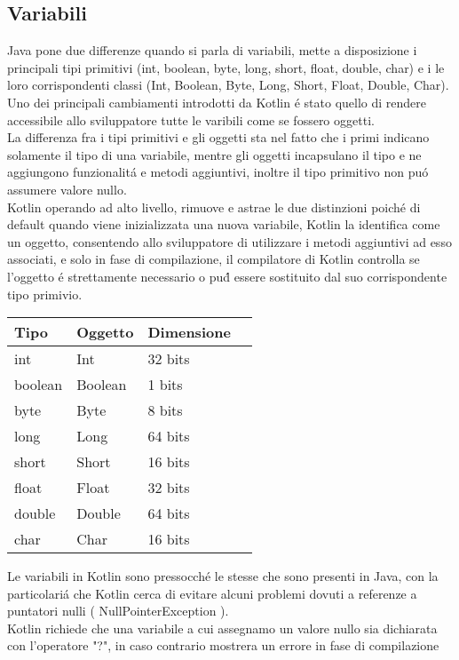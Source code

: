 \subsection{Variabili}
Java pone due differenze quando si parla di variabili, mette a disposizione i principali tipi primitivi (int, boolean, byte, long, short, float, double, char) e i le loro corrispondenti classi (Int, Boolean, Byte, Long, Short, Float, Double, Char).
Uno dei principali cambiamenti introdotti da Kotlin \'e stato quello di rendere accessibile allo sviluppatore tutte le varibili come se fossero oggetti.\\
La differenza fra i tipi primitivi e gli oggetti sta nel fatto che i primi indicano solamente il tipo di una variabile, mentre gli oggetti incapsulano il tipo e ne aggiungono funzionalit\'a e metodi aggiuntivi, inoltre il tipo primitivo non pu\'o assumere valore nullo. \\
Kotlin operando ad alto livello, rimuove e astrae le due distinzioni poich\'e di default quando viene inizializzata una nuova variabile, Kotlin la identifica come un oggetto, consentendo allo sviluppatore di utilizzare i metodi aggiuntivi ad esso associati, e solo in fase di compilazione, il compilatore di Kotlin controlla se l'oggetto \'e strettamente necessario o pu\'d essere sostituito dal suo corrispondente tipo primivio.

\begin{center}
    \begin{tabular}{ | l | l | l | p{5cm} |}
    \hline
    Tipo & Oggetto & Dimensione \\ \hline
    int & Int & 32 bits\\ \hline
    boolean & Boolean & 1 bits\\ \hline
    byte & Byte & 8 bits\\ \hline
    long & Long & 64 bits\\ \hline
    short & Short & 16 bits\\ \hline
    float & Float & 32 bits\\ \hline
    double & Double & 64 bits\\ \hline
    char & Char & 16 bits\\ \hline

    \end{tabular}
\end{center}

Le variabili in Kotlin sono pressocch\'e le stesse che sono presenti in Java, con la particolari\'a che Kotlin cerca di evitare alcuni problemi dovuti a referenze a puntatori nulli ( NullPointerException ). \\
Kotlin richiede che una variabile a cui assegnamo un valore nullo sia dichiarata con l'operatore "?", in caso contrario mostrera un errore in fase di compilazione

